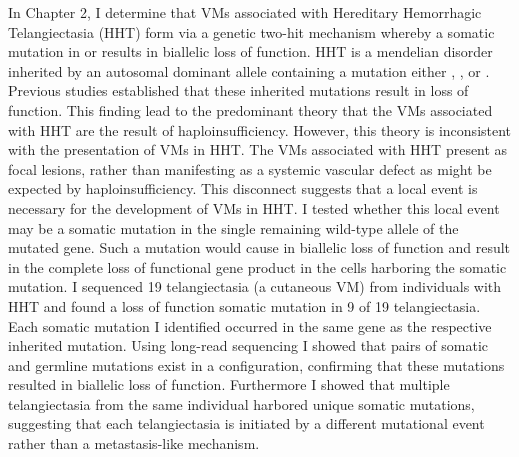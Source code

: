 In Chapter 2, I determine that VMs associated with Hereditary Hemorrhagic Telangiectasia (HHT) form via a genetic two-hit mechanism whereby a somatic mutation in  or  results in biallelic loss of function. HHT is a mendelian disorder inherited by an autosomal dominant allele containing a mutation either , , or . Previous studies established that these inherited mutations result in loss of function. This finding lead to the predominant theory that the VMs associated with HHT are the result of haploinsufficiency. However, this theory is inconsistent with the presentation of VMs in HHT. The VMs associated with HHT present as focal lesions, rather than manifesting as a systemic vascular defect as might be expected by haploinsufficiency. This disconnect suggests that a local event is necessary for the development of VMs in HHT. I tested whether this local event may be a somatic mutation in the single remaining wild-type allele of the mutated gene. Such a mutation would cause in biallelic loss of function and result in the complete loss of functional gene product in the cells harboring the somatic mutation. I sequenced 19 telangiectasia (a cutaneous VM) from individuals with HHT and found a loss of function somatic mutation in 9 of 19 telangiectasia. Each somatic mutation I identified occurred in the same gene as the respective inherited mutation. Using long-read sequencing I showed that pairs of somatic and germline mutations exist in a  configuration, confirming that these mutations resulted in biallelic loss of function. Furthermore I showed that multiple telangiectasia from the same individual harbored unique somatic mutations, suggesting that each telangiectasia is initiated by a different mutational event rather than a metastasis-like mechanism. 

